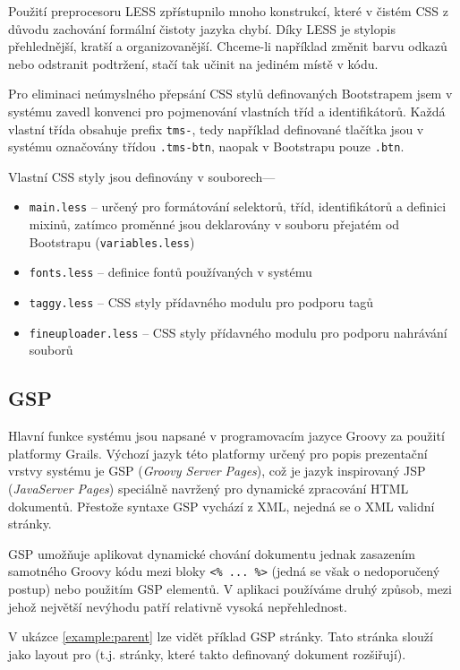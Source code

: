 Použití preprocesoru LESS zpřístupnilo mnoho konstrukcí, které v čistém CSS z důvodu zachování formální čistoty jazyka chybí. Díky LESS je stylopis přehlednější, kratší a organizovanější. Chceme-li například změnit barvu odkazů nebo odstranit podtržení, stačí tak učinit na jediném místě v kódu.

Pro eliminaci neúmyslného přepsání CSS stylů definovaných Bootstrapem jsem v systému zavedl konvenci pro pojmenování vlastních tříd a identifikátorů. Každá vlastní třída obsahuje prefix \texttt{tms-}, tedy například definované tlačítka jsou v systému označovány třídou \texttt{.tms-btn}, naopak v Bootstrapu pouze \texttt{.btn}.

Vlastní CSS styly jsou definovány v souborech---

\begin{itemize}
    \item \texttt{main.less} -- určený pro formátování selektorů, tříd, identifikátorů a definici mixinů, zatímco proměnné jsou deklarovány v souboru přejatém od Bootstrapu (\texttt{variables.less})
    \item \texttt{fonts.less} -- definice fontů používaných v systému
    \item \texttt{taggy.less} -- CSS styly přídavného modulu pro podporu tagů
    \item \texttt{fineuploader.less} -- CSS styly přídavného modulu pro podporu nahrávání souborů
\end{itemize}

\subsection{GSP}
\label{subsec:gsp}

Hlavní funkce systému jsou napsané v programovacím jazyce Groovy za použití platformy Grails. Výchozí jazyk této platformy určený pro popis prezentační vrstvy systému je GSP (\textit{Groovy Server Pages}), což je jazyk inspirovaný JSP (\textit{JavaServer Pages}) speciálně navržený pro dynamické zpracování HTML dokumentů. Přestože syntaxe GSP vychází z XML, nejedná se o XML validní stránky.

GSP umožňuje aplikovat dynamické chování dokumentu jednak zasazením samotného Groovy kódu mezi bloky \texttt{<\% ... \%>} (jedná se však o nedoporučený postup) nebo použitím GSP elementů. V aplikaci používáme druhý způsob, mezi jehož největší nevýhodu patří relativně vysoká nepřehlednost.

V ukázce \ref{example:parent} lze vidět příklad GSP stránky. Tato stránka slouží jako layout pro  (t.j. stránky, které takto definovaný dokument rozšiřují).

